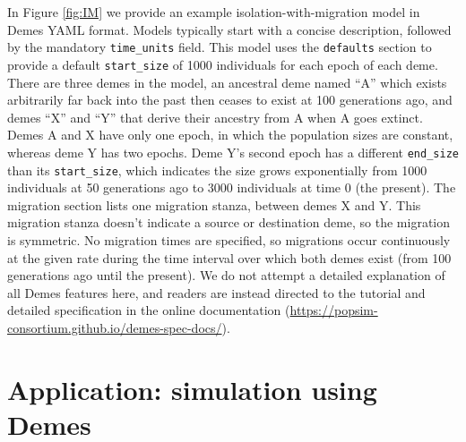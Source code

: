 \documentclass[11pt]{article}
\begin{document}
In Figure \ref{fig:IM} we provide an example isolation-with-migration model in Demes YAML format.
Models typically start with a concise description, followed by the mandatory
\texttt{time\_units} field.
This model uses the \texttt{defaults} section to provide a default \texttt{start\_size}
of 1000 individuals for each epoch of each deme.
There are three demes in the model, an ancestral deme named ``A'' which exists
arbitrarily far back into the past then ceases to exist at 100 generations ago,
and demes ``X'' and ``Y'' that derive their
ancestry from A when A goes extinct.
Demes A and X have only one epoch, in which the population sizes are
constant, whereas deme Y has two epochs. Deme Y's second epoch has a different
\texttt{end\_size} than its \texttt{start\_size}, which indicates the size
grows exponentially from 1000 individuals at 50 generations ago to 3000
individuals at time 0 (the present).
The migration section lists one migration stanza, between demes X and Y.
This migration stanza doesn't indicate a source or destination deme,
so the migration is symmetric. No migration times are specified, so migrations
occur continuously at the given rate during the time interval over which
both demes exist (from 100 generations ago until the present).
We do not attempt a detailed explanation of all Demes features here,
and readers are instead directed to the tutorial and detailed specification
in the online documentation
(\url{https://popsim-consortium.github.io/demes-spec-docs/}).

\section*{Application: simulation using Demes}
\end{document}
